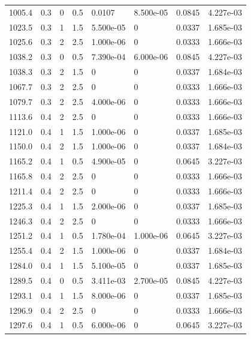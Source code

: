 \documentclass[preview]{standalone}
\begin{document}
{{{\begin{tabular}{L{1.2cm}C{1.2cm} C{0.3cm}C{0.5cm} C{1.4cm}C{1.4cm} C{1.4cm}C{1.4cm}}
  1005.4  &   0.3  & 0     & 0.5 &  0.0107  & 8.500e-05  & 0.0845 &  4.227e-03   \\ 
  1023.5  &   0.3  & 1     & 1.5 &  5.500e-05  & 0  & 0.0337 &  1.685e-03   \\ 
  1025.6  &   0.3  & 2     & 2.5 &  1.000e-06  & 0  & 0.0333 &  1.666e-03   \\ 
  1038.2  &   0.3  & 0     & 0.5 &  7.390e-04  & 6.000e-06  & 0.0845 &  4.227e-03   \\ 
  1038.3  &   0.3  & 2     & 1.5 &  0  & 0  & 0.0337 &  1.684e-03   \\ 
  1067.7  &   0.3  & 2     & 2.5 &  0  & 0  & 0.0333 &  1.666e-03   \\ 
  1079.7  &   0.3  & 2     & 2.5 &  4.000e-06  & 0  & 0.0333 &  1.666e-03   \\ 
  1113.6  &   0.4  & 2     & 2.5 &  0  & 0  & 0.0333 &  1.666e-03   \\ 
  1121.0  &   0.4  & 1     & 1.5 &  1.000e-06  & 0  & 0.0337 &  1.685e-03   \\ 
  1150.0  &   0.4  & 2     & 1.5 &  1.000e-06  & 0  & 0.0337 &  1.684e-03   \\ 
  1165.2  &   0.4  & 1     & 0.5 &  4.900e-05  & 0  & 0.0645 &  3.227e-03   \\ 
  1165.8  &   0.4  & 2     & 2.5 &  0  & 0  & 0.0333 &  1.666e-03   \\ 
  1211.4  &   0.4  & 2     & 2.5 &  0  & 0  & 0.0333 &  1.666e-03   \\ 
  1225.3  &   0.4  & 1     & 1.5 &  2.000e-06  & 0  & 0.0337 &  1.685e-03   \\ 
  1246.3  &   0.4  & 2     & 2.5 &  0  & 0  & 0.0333 &  1.666e-03   \\ 
  1251.2  &   0.4  & 1     & 0.5 &  1.780e-04  & 1.000e-06  & 0.0645 &  3.227e-03   \\ 
  1255.4  &   0.4  & 2     & 1.5 &  1.000e-06  & 0  & 0.0337 &  1.684e-03   \\ 
  1284.0  &   0.4  & 1     & 1.5 &  5.100e-05  & 0  & 0.0337 &  1.685e-03   \\ 
  1289.5  &   0.4  & 0     & 0.5 &  3.411e-03  & 2.700e-05  & 0.0845 &  4.227e-03   \\ 
  1293.1  &   0.4  & 1     & 1.5 &  8.000e-06  & 0  & 0.0337 &  1.685e-03   \\ 
  1296.9  &   0.4  & 2     & 2.5 &  0  & 0  & 0.0333 &  1.666e-03   \\ 
  1297.6  &   0.4  & 1     & 0.5 &  6.000e-06  & 0  & 0.0645 &  3.227e-03   \\ 

\end{tabular}}}}
\end{document}
